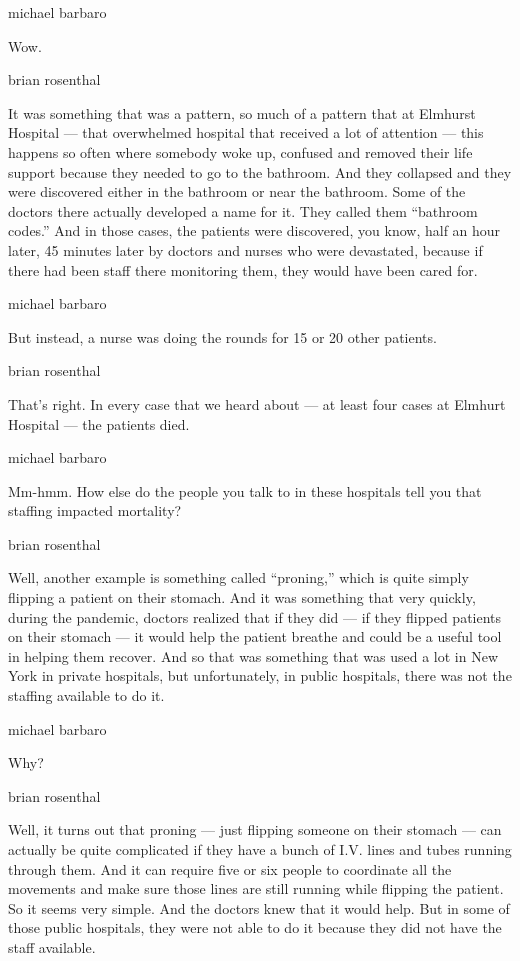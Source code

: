 michael barbaro

Wow.

brian rosenthal

It was something that was a pattern, so much of a pattern that at
Elmhurst Hospital --- that overwhelmed hospital that received a lot of
attention --- this happens so often where somebody woke up, confused and
removed their life support because they needed to go to the bathroom.
And they collapsed and they were discovered either in the bathroom or
near the bathroom. Some of the doctors there actually developed a name
for it. They called them ``bathroom codes.'' And in those cases, the
patients were discovered, you know, half an hour later, 45 minutes later
by doctors and nurses who were devastated, because if there had been
staff there monitoring them, they would have been cared for.

michael barbaro

But instead, a nurse was doing the rounds for 15 or 20 other patients.

brian rosenthal

That's right. In every case that we heard about --- at least four cases
at Elmhurt Hospital --- the patients died.

michael barbaro

Mm-hmm. How else do the people you talk to in these hospitals tell you
that staffing impacted mortality?

brian rosenthal

Well, another example is something called ``proning,'' which is quite
simply flipping a patient on their stomach. And it was something that
very quickly, during the pandemic, doctors realized that if they did ---
if they flipped patients on their stomach --- it would help the patient
breathe and could be a useful tool in helping them recover. And so that
was something that was used a lot in New York in private hospitals, but
unfortunately, in public hospitals, there was not the staffing available
to do it.

michael barbaro

Why?

brian rosenthal

Well, it turns out that proning --- just flipping someone on their
stomach --- can actually be quite complicated if they have a bunch of
I.V. lines and tubes running through them. And it can require five or
six people to coordinate all the movements and make sure those lines are
still running while flipping the patient. So it seems very simple. And
the doctors knew that it would help. But in some of those public
hospitals, they were not able to do it because they did not have the
staff available.


